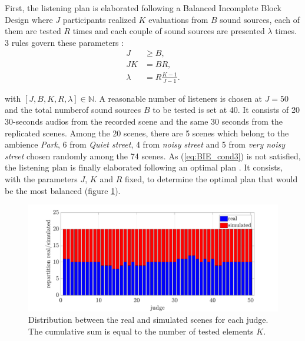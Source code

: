 \documentclass[a4,11pt,twocolumn]{article}
\begin{document}
First, the listening plan is elaborated following a Balanced Incomplete Block Design \cite{dagnelie_principes_2003} where $J$ participants realized $K$ evaluations from $B$ sound sources, each of them are tested $R$ times and each couple of sound sources are presented $\lambda$ times. 3 rules govern these parameters : 
\begin{subequations}\label{eq:BIE_cond}
\begin{align}
J &\geq B, \label{eq:BIE_cond1}\\
JK &= BR, \label{eq:BIE_cond2}\\
\lambda &= R\frac{K-1}{J-1}. \label{eq:BIE_cond3}
\end{align}
\end{subequations}

with $\left[J, B, K, R, \lambda\right] \in \mathbb{N}$. A reasonable number of listeners is chosen at $J = 50$ and the total numberof sound sources $B$ to be tested is set at 40. It consists of 20 30-seconds audios from the recorded scene and the same 30 seconds from the replicated scenes. Among the 20 scenes, there are 5 scenes which belong to the ambience \textit{Park}, 6 from \textit{Quiet street}, 4 from \textit{noisy street} and 5 from \textit{very noisy street} chosen randomly among the 74 scenes. As (\ref{eq:BIE_cond3}) is not satisfied, the listening plan is finally elaborated following an optimal plan \cite{pages_blocs_2007}. It consists, with the parameters $J$, $K$ and $R$ fixed, to determine the optimal plan that would be the most balanced (figure \ref{fig:repartition}).\\

\begin{figure}[ht]
\centering
\includegraphics[width = \linewidth]{./pictures/repartition-real-simulated.pdf}
\caption{Distribution between the real and simulated scenes for each judge. The cumulative sum is equal to the number of tested elements $K$.}
\label{fig:repartition}
\end{figure}
\end{document}
